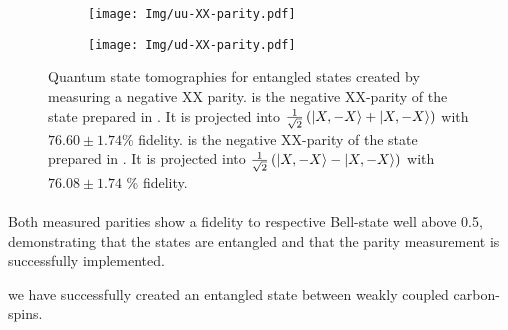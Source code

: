 \begin{figure}[htbp]
    \begin{subfigure}[t]{0.49\textwidth}\centering
        \caption{}
        \texttt{[image: Img/uu-XX-parity.pdf]}
        \label{fig:uu-XX}
    \end{subfigure}
    \begin{subfigure}[t]{0.49\textwidth}\centering
        \caption{}
        \texttt{[image: Img/ud-XX-parity.pdf]}
        \label{fig:ud-XX}
    \end{subfigure}
    \caption{ Quantum state tomographies for entangled states created by measuring a negative XX parity.
     is the negative XX-parity of the state prepared in . It is projected into $    \tfrac{1}{\sqrt{2}} \left( {\left\vert{X,-X}\right\rangle} +{\left\vert{X,-X}\right\rangle} \right)
$ with  $76.60 \pm 1.74\%$ fidelity.
     is the negative XX-parity of the state prepared in . It is projected into $\tfrac{1}{\sqrt{2}} \left( {\left\vert{X,-X}\right\rangle} -{\left\vert{X,-X}\right\rangle} \right)$  with  $76.08 \pm 1.74$ \% fidelity.
    }
    \label{fig:2qubit_parity_Tomos}
\end{figure}

\paragraph{ }
Both measured parities show a fidelity to respective Bell-state well above 0.5, demonstrating that the states are entangled and that the parity measurement is successfully implemented.

we have successfully created an entangled state between weakly coupled carbon-spins.


